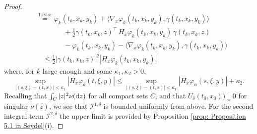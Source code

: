 \begin{proof}
\begin{align*}
        & \overset{\text{Taylor}}{=} \varphi_k(t_k,x_k,y_k) + \langle \nabla_x \varphi_k(t_k,x_k,y_k), \gamma(t_k,x_k,y_k) \rangle \\
        & \qquad \qquad+ \frac 1 2 \gamma(t_k,x_k,z)^\top \, H_x \varphi_k(t_k,x_k,y_k) \, \gamma(t_k,x_k,z) \\
        & \qquad \qquad  - \varphi_k(t_k,x_k,y_k) - \langle \nabla_x \varphi_k(t_k,x_k,y_k), \gamma(t_k,x_k,y_k) \rangle \\
        & \quad \leq \frac 1 2 |\gamma(t_k,x_k,z)|^2 |H_x \varphi_k(t_k,x_k,y_k)|,
    \end{align*}
    where, for $k$ large enough and some $\kappa_1, \kappa_2 > 0$, 
    \begin{equation*}
        \sup_{|(s,\xi)-(t,x)| < \kappa_1} |H_x \varphi_k(t,\xi,y)| \leq \sup_{|(s,\xi)-(t,x)| < \kappa_1} |H_x \varphi_\alpha (s,\xi,y)| + \kappa_2.
    \end{equation*}
    Recalling that $\int_C |z|^2 \nu(\mathrm{d} z)$ for all compact sets $C$, and that $U_\delta (t_0,x_0)) \downarrow 0$ for singular $\nu(z)$, we see that $\mathcal{I}^{1,\delta}$ is bounded uniformly from above. For the second integral term $\mathcal I^{2,\delta}$ the upper limit is provided by Proposition \ref{prop: Proposition 5.1 in Seydel}(i). 


\end{proof}
